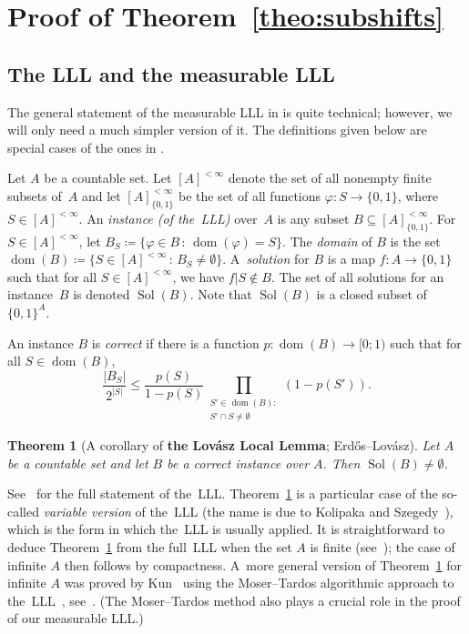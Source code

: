 \documentclass[12pt]{amsart}
\newtheorem{theo}{Theorem}[section]
\theoremstyle{definition}
\theoremstyle{remark}
\newcommand{\0}{\emptyset}
\newcommand{\set}[1]{\{#1\}}
\newcommand{\dom}{\operatorname{dom}}
\renewcommand{\phi}{\varphi}
\numberwithin{equation}{section}
\begin{document}
	\section{Proof of Theorem~\ref{theo:subshifts}}
	
	\subsection{The LLL and the measurable LLL}
	
	The general statement of the measurable LLL in \cite{B} is quite technical; however, we will only need a much simpler version of it. The definitions given below are special cases of the ones in \cite[Sections~1.2 and~5.1]{B}.
	
	Let $A$ be a countable set. Let $[A]^{<\infty}$ denote the set of all nonempty finite subsets of~$A$ and let $[A]^{<\infty}_{\set{0,1}}$ be the set of all functions $\phi \colon S \to \set{0,1}$, where $S \in [A]^{<\infty}$. An \emph{instance (of the~LLL)} over~$A$ is any subset ${B} \subseteq [A]^{<\infty}_{\set{0,1}}$. %
	For $S \in [A]^{<\infty}$, let $B_S \coloneqq \set{\phi \in {B} \,:\, \dom(\phi) = S}$. The \emph{domain} of ${B}$ is the set $\dom({B}) \coloneqq \set{S \in [A]^{<\infty} \,:\, {B}_S \neq \0}$. A~\emph{solution} for ${B}$ is a map $f \colon A \to \set{0,1}$ such that for all $S \in [A]^{<\infty}$, we have $f \vert S \not \in {B}$. The set of all solutions for an instance~${B}$ is denoted $\operatorname{Sol}({B})$. Note that $\operatorname{Sol}({B})$ is a closed subset of $\set{0,1}^A$.
	
	An instance ${B}$ is \emph{correct} if there is a function $p \colon \dom({B}) \to [0;1)$ such that for all $S \in \dom({B})$,
	\begin{equation}\label{eq:correct}
	\frac{|{B}_S|}{2^{|S|}} \leq \frac{p(S)}{1 - p(S)} \prod_{\substack{S' \in \dom({B}):\\ S' \cap S \neq \0}} (1 - p(S')).
	\end{equation}
	
	\begin{theo}[{A corollary of \textbf{the Lov\'asz Local Lemma}; Erd\H os--Lov\'asz}]\label{theo:LLL}
		Let $A$ be a countable set and let ${B}$ be a correct instance over $A$. Then $\operatorname{Sol}({B}) \neq \0$.
	\end{theo}
	
	See~\cite[Lemma~5.1.1]{AlonSpencer} for the full statement of the~LLL. Theorem~\ref{theo:LLL} is a particular case of the so-called \emph{variable version} of the~LLL (the name is due to Kolipaka and Szegedy~\cite{KSz}), which is the form in which the~LLL is usually applied. It is straightforward to deduce Theorem~\ref{theo:LLL} from the full~LLL when the set $A$ is finite (see~\cite[Corollary~1.7]{B}); the case of infinite $A$ then follows by compactness. A~more general version of Theorem~\ref{theo:LLL} for infinite $A$ was proved by Kun~\cite{Kun} using the Moser--Tardos algorithmic approach to the~LLL~\cite{MT}, see~\cite[Theorem~1.8]{B}. (The Moser--Tardos method also plays a crucial role in the proof of our measurable LLL.)
	
\end{document}
